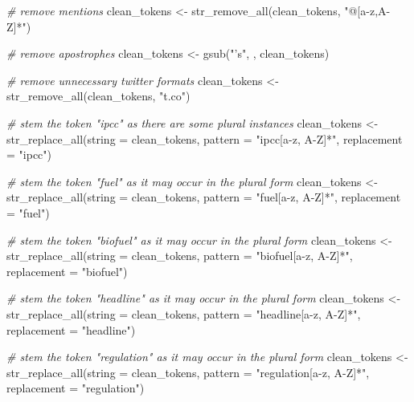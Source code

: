 \documentclass[
]{article}
\newenvironment{Shaded}{\begin{snugshade}}{\end{snugshade}}
\newcommand{\AttributeTok}[1]{\textcolor[rgb]{0.77,0.63,0.00}{#1}}
\newcommand{\CommentTok}[1]{\textcolor[rgb]{0.56,0.35,0.01}{\textit{#1}}}
\newcommand{\FunctionTok}[1]{\textcolor[rgb]{0.00,0.00,0.00}{#1}}
\newcommand{\NormalTok}[1]{#1}
\newcommand{\OtherTok}[1]{\textcolor[rgb]{0.56,0.35,0.01}{#1}}
\newcommand{\StringTok}[1]{\textcolor[rgb]{0.31,0.60,0.02}{#1}}
\begin{document}
\begin{Shaded}
\begin{Highlighting}[]
\CommentTok{\# remove mentions}
\NormalTok{clean\_tokens }\OtherTok{\textless{}{-}} \FunctionTok{str\_remove\_all}\NormalTok{(clean\_tokens, }\StringTok{"@[a{-}z,A{-}Z]*"}\NormalTok{)}

\CommentTok{\# remove apostrophes}
\NormalTok{clean\_tokens }\OtherTok{\textless{}{-}} \FunctionTok{gsub}\NormalTok{(}\StringTok{"’s"}\NormalTok{, }\StringTok{\textquotesingle{}\textquotesingle{}}\NormalTok{, clean\_tokens)}

\CommentTok{\# remove unnecessary twitter formats}
\NormalTok{clean\_tokens }\OtherTok{\textless{}{-}} \FunctionTok{str\_remove\_all}\NormalTok{(clean\_tokens, }\StringTok{"t.co"}\NormalTok{)}

\CommentTok{\# stem the token "ipcc" as there are some plural instances}
\NormalTok{clean\_tokens }\OtherTok{\textless{}{-}} \FunctionTok{str\_replace\_all}\NormalTok{(}\AttributeTok{string =}\NormalTok{ clean\_tokens,}
                                \AttributeTok{pattern =} \StringTok{"ipcc[a{-}z, A{-}Z]*"}\NormalTok{, }
                                \AttributeTok{replacement =} \StringTok{"ipcc"}\NormalTok{)}


\CommentTok{\# stem the token "fuel" as it may occur in the plural form}
\NormalTok{clean\_tokens }\OtherTok{\textless{}{-}} \FunctionTok{str\_replace\_all}\NormalTok{(}\AttributeTok{string =}\NormalTok{ clean\_tokens,}
                                \AttributeTok{pattern =} \StringTok{"fuel[a{-}z, A{-}Z]*"}\NormalTok{, }
                                \AttributeTok{replacement =} \StringTok{"fuel"}\NormalTok{)}

\CommentTok{\# stem the token "biofuel" as it may occur in the plural form}
\NormalTok{clean\_tokens }\OtherTok{\textless{}{-}} \FunctionTok{str\_replace\_all}\NormalTok{(}\AttributeTok{string =}\NormalTok{ clean\_tokens,}
                                \AttributeTok{pattern =} \StringTok{"biofuel[a{-}z, A{-}Z]*"}\NormalTok{, }
                                \AttributeTok{replacement =} \StringTok{"biofuel"}\NormalTok{)}

\CommentTok{\# stem the token "headline" as it may occur in the plural form}
\NormalTok{clean\_tokens }\OtherTok{\textless{}{-}} \FunctionTok{str\_replace\_all}\NormalTok{(}\AttributeTok{string =}\NormalTok{ clean\_tokens,}
                                \AttributeTok{pattern =} \StringTok{"headline[a{-}z, A{-}Z]*"}\NormalTok{, }
                                \AttributeTok{replacement =} \StringTok{"headline"}\NormalTok{)}

\CommentTok{\# stem the token "regulation" as it may occur in the plural form}
\NormalTok{clean\_tokens }\OtherTok{\textless{}{-}} \FunctionTok{str\_replace\_all}\NormalTok{(}\AttributeTok{string =}\NormalTok{ clean\_tokens,}
                                \AttributeTok{pattern =} \StringTok{"regulation[a{-}z, A{-}Z]*"}\NormalTok{, }
                                \AttributeTok{replacement =} \StringTok{"regulation"}\NormalTok{)}


\end{Highlighting}
\end{Shaded}
\end{document}

